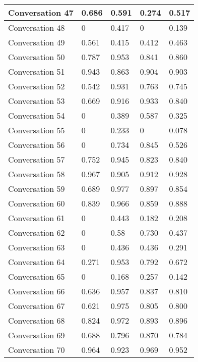 \begin{table}[]
\begin{tabular}{|l|l|l|l|l|}
Conversation 47  & 0.686    & 0.591 & 0.274       & 0.517   \\ \hline
Conversation 48  & 0        & 0.417 & 0           & 0.139   \\ \hline
Conversation 49  & 0.561    & 0.415 & 0.412       & 0.463   \\ \hline
Conversation 50  & 0.787    & 0.953 & 0.841       & 0.860   \\ \hline
Conversation 51  & 0.943    & 0.863 & 0.904       & 0.903   \\ \hline
Conversation 52  & 0.542    & 0.931 & 0.763       & 0.745   \\ \hline
Conversation 53  & 0.669    & 0.916 & 0.933       & 0.840   \\ \hline
Conversation 54  & 0        & 0.389 & 0.587       & 0.325   \\ \hline
Conversation 55  & 0        & 0.233 & 0           & 0.078   \\ \hline
Conversation 56  & 0        & 0.734 & 0.845       & 0.526   \\ \hline
Conversation 57  & 0.752    & 0.945 & 0.823       & 0.840   \\ \hline
Conversation 58  & 0.967    & 0.905 & 0.912       & 0.928   \\ \hline
Conversation 59  & 0.689    & 0.977 & 0.897       & 0.854   \\ \hline
Conversation 60  & 0.839    & 0.966 & 0.859       & 0.888   \\ \hline
Conversation 61  & 0        & 0.443 & 0.182       & 0.208   \\ \hline
Conversation 62  & 0        & 0.58  & 0.730       & 0.437   \\ \hline
Conversation 63  & 0        & 0.436 & 0.436       & 0.291   \\ \hline
Conversation 64  & 0.271    & 0.953 & 0.792       & 0.672   \\ \hline
Conversation 65  & 0        & 0.168 & 0.257       & 0.142   \\ \hline
Conversation 66  & 0.636    & 0.957 & 0.837       & 0.810   \\ \hline
Conversation 67  & 0.621    & 0.975 & 0.805       & 0.800   \\ \hline
Conversation 68  & 0.824    & 0.972 & 0.893       & 0.896   \\ \hline
Conversation 69  & 0.688    & 0.796 & 0.870       & 0.784   \\ \hline
Conversation 70  & 0.964    & 0.923 & 0.969       & 0.952   \\ \hline

\end{tabular}
\end{table}
